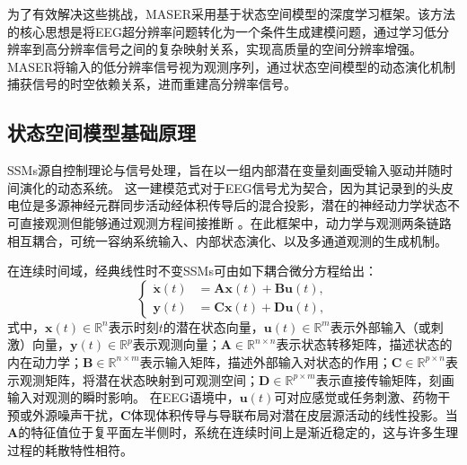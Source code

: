 为了有效解决这些挑战，MASER采用基于状态空间模型的深度学习框架。该方法的核心思想是将EEG超分辨率问题转化为一个条件生成建模问题，通过学习低分辨率到高分辨率信号之间的复杂映射关系，实现高质量的空间分辨率增强。MASER将输入的低分辨率信号视为观测序列，通过状态空间模型的动态演化机制捕获信号的时空依赖关系，进而重建高分辨率信号。

\subsection{状态空间模型基础原理}
SSMs源自控制理论与信号处理，旨在以一组内部潜在变量刻画受输入驱动并随时间演化的动态系统。
这一建模范式对于EEG信号尤为契合，因为其记录到的头皮电位是多源神经元群同步活动经体积传导后的混合投影，潜在的神经动力学状态不可直接观测但能够通过观测方程间接推断 \cite{teplan2002fundamentals, ferree2001spatial, friston2008multiple}。在此框架中，动力学与观测两条链路相互耦合，可统一容纳系统输入、内部状态演化、以及多通道观测的生成机制。


在连续时间域，经典线性时不变SSMs可由如下耦合微分方程给出：
\begin{equation}
\left\{
\begin{aligned}
\dot{\mathbf{x}}(t) &= \mathbf{A}\mathbf{x}(t) + \mathbf{B}\mathbf{u}(t), \\
\mathbf{y}(t) &= \mathbf{C}\mathbf{x}(t) + \mathbf{D}\mathbf{u}(t),
\end{aligned}
\right.
\label{eq:continuous_ssm}
\end{equation}
式中，$\mathbf{x}(t)\in\mathbb{R}^{n}$表示时刻$t$的潜在状态向量，$\mathbf{u}(t)\in\mathbb{R}^{m}$表示外部输入（或刺激）向量，$\mathbf{y}(t)\in\mathbb{R}^{p}$表示观测向量；$\mathbf{A}\in\mathbb{R}^{n\times n}$表示状态转移矩阵，描述状态的内在动力学；$\mathbf{B}\in\mathbb{R}^{n\times m}$表示输入矩阵，描述外部输入对状态的作用；$\mathbf{C}\in\mathbb{R}^{p\times n}$表示观测矩阵，将潜在状态映射到可观测空间；$\mathbf{D}\in\mathbb{R}^{p\times m}$表示直接传输矩阵，刻画输入对观测的瞬时影响。
在EEG语境中，$\mathbf{u}(t)$可对应感觉或任务刺激、药物干预或外源噪声干扰，$\mathbf{C}$体现体积传导与导联布局对潜在皮层源活动的线性投影\cite{ferree2001spatial}。当$\mathbf{A}$的特征值位于复平面左半侧时，系统在连续时间上是渐近稳定的，这与许多生理过程的耗散特性相符。

